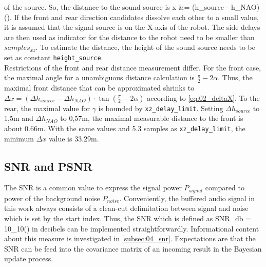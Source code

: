 of the source.
So, the distance to the sound source is
\bal
\Delta x &= (\Delta h_{source} - \Delta h_{NAO}) \cdot \tan(\gamma).
\label{eq:02_deltaX}
\eal
If the front and rear direction candidates dissolve each other to a small
value, it is assumed that the signal source is on the X-axis of the robot.
The side delays are then used as indicator for the distance to the robot
need to be smaller than
 $samples_{xz}$.
To estimate the distance, the height of the sound source needs to be set as
constant  \lstinline!height_source!.\\
Restrictions of the front and rear distance measurement differ.
For the front case, the maximal angle for a unambiguous distance calculation
is $\frac{\pi}{2}- 2\alpha$.
Thus, the maximal front distance that can be approximated shrinks to
$\Delta x = (\Delta h_{source} - \Delta h_{NAO}) \cdot \tan(\frac{\pi}{2} - 2\alpha)$
according to \cref{eq:02_deltaX}.
To the rear, the maximal value for $\gamma$ is bounded by 
\lstinline!xz_delay_limit!.
Setting $\Delta h_{source}$ to 1,5\si{m} and $\Delta h_{NAO}$ to 0,57\si{m},
the maximal measurable distance to the front is about 0.66\si{m}.
With the same values and 5.3 samples as \lstinline!xz_delay_limit!, the
minimum $\Delta x$ value is 33.29\si{m}.

\subsection{SNR and PSNR}
\label{subsec:03_snr}

The \acf{SNR} is a common value to express the signal power $P_{signal}$ compared
to power of the background noise $P_{noise}$.
Conveniently, the buffered audio signal in this work always consists of
a clean-cut delimitation between signal and noise which is set by the
start index.
Thus, the \ac{SNR} which is defined as
\bal
    SNR_{db} = 10\log_{10}\left(\right)
    \label{eq:03_snr}
\eal
in decibels can be implemented straightforwardly.
Informational content about this measure is investigated in \cref{subsec:04_snr}.
Expectations are that the \ac{SNR} can be feed into the covariance matrix
of an incoming result in the Bayesian update process.

